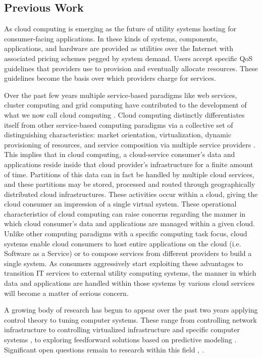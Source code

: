 \subsection{Previous Work}
As cloud computing is emerging as the future of utility systems hosting for consumer-facing applications.  In these kinds of systems, components, applications, and hardware are provided as utilities over the Internet with associated pricing schemes pegged by system demand.  Users accept specific QoS guidelines that providers use to provision and eventually allocate resources. These guidelines become the basis over which providers charge for services.

Over the past few years multiple service-based paradigms like web services, cluster computing and grid computing have contributed to the development of what we now call cloud computing \cite{Bu:09}. Cloud computing distinctly differentiates itself from other service-based computing paradigms via a collective set of distinguishing characteristics:  market orientation, virtualization, dynamic provisioning of resources, and service composition via multiple service providers \cite{BuYeVeBrBr:09}. This implies that in cloud computing, a cloud-service consumer's data and applications reside inside that cloud provider's infrastructure for a finite amount of time.  Partitions of this data can in fact be handled by multiple cloud services, and these partitions may be stored, processed and routed through geographically distributed cloud infrastructures. These activities occur within a cloud, giving the cloud consumer an impression of a single virtual system.  These operational characteristics of cloud computing can raise concerns regarding the manner in which cloud consumer's data and applications are managed within a given cloud. Unlike other computing paradigms with a specific computing task focus, cloud systems enable cloud consumers to host entire applications on the cloud (i.e. Software as a Service) or to compose services from different providers to build a single system. As consumers aggressively start exploiting these advantages to transition IT services to external utility computing systems, the manner in which data and applications are handled within those systems by various cloud services will become a matter of serious concern.

A growing body of research has begun to appear over the past two years applying control theory to tuning computer systems.  These range from controlling network infrastructure \cite{ctrl:ariba-GL:2009} to controlling virtualized infrastructure and specific computer systems \cite{ctrl:wang-cgswrzh:2009}, \cite{ctrl:kjaer-kr:2009} to exploring feedforward solutions based on predictive modeling \cite{ctrl:abdelwahed-bsk:2009}.  Significant open questions remain to research within this field \cite{ctrl:Zhu:2009:CTB:1496909.1496922}, \cite{ctrl:hellerstein-sw:2009}.